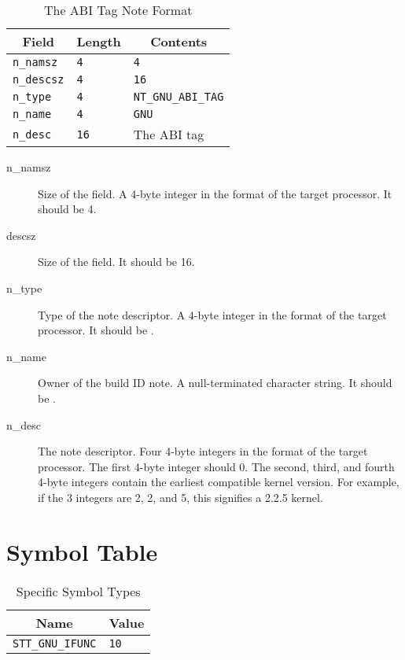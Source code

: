 \begin{table}[H]
\Hrule
 \caption{The ABI Tag Note Format}
 \label{format-abi_tag}
 \begin{center}
  \begin{tabular}[t]{l|l|l}
   \multicolumn{1}{c}{Field}
     & \multicolumn{1}{c}{Length}
       & \multicolumn{1}{c}{Contents} \\
   \hline
   \texttt{n_namsz} & \texttt{4} & \texttt{4} \\
   \texttt{n_descsz} & \texttt{4} & \texttt{16} \\
   \texttt{n_type} & \texttt{4} & \texttt{NT_GNU_ABI_TAG} \\
   \texttt{n_name} & \texttt{4} & \texttt{GNU} \\
   \texttt{n_desc} & \texttt{16} & The ABI tag\\
  \end{tabular}
 \end{center}
\Hrule
\end{table}

\begin{description}
 \item[n_namsz] Size of the  field.  A 4-byte integer in the
   format of the target processor.  It should be 4.
 \item[descsz] Size of the  field.  It should be 16.
 \item[n_type] Type of the note descriptor.  A 4-byte integer in the format
   of the target processor.  It should be .
 \item[n_name] Owner of the build ID note.  A null-terminated character
   string.  It should be .
 \item[n_desc] The note descriptor. Four 4-byte integers in the format of
   the target processor.  The first 4-byte integer should 0.  The second,
   third, and fourth 4-byte integers contain the earliest compatible
   kernel version.  For example, if the 3 integers are 2, 2, and 5, this
   signifies a 2.2.5 kernel.
\end{description}

\section{Symbol Table}

\begin{table}[H]
\Hrule
  \caption{\xOS Specific Symbol Types}
  \label{ifunc}
  \begin{center}
    \begin{tabular}[t]{l|l}
      \multicolumn{1}{c}{Name} & \multicolumn{1}{c}{Value} \\
      \hline
      \texttt{STT_GNU_IFUNC} & \texttt{10}
    \end{tabular}
  \end{center}
\Hrule
\end{table}

